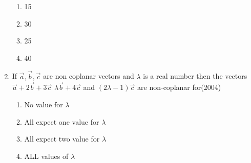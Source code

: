 \documentclass[12pt]{article}
\providecommand{\brak}[1]{\ensuremath{\left(#1\right)}}
\begin{document}
\begin{enumerate}
\begin{enumerate}
\item 15
\item 30
\item 25 
\item 40
\end{enumerate} 
\item If $\vec{a},\vec{b},\vec{c}$ are non coplanar vectors and $\lambda$ is a real number then the vectors $\vec{a}+2\vec{b}+3\vec{c}$ $\lambda\vec{b}+4\vec{c}$ and $\brak{2\lambda-1}\vec{c}$ are non-coplanar for(2004) 
\begin{enumerate}
\item  No value for $\lambda$
\item  All expect one value for $\lambda$
\item  All expect two value for $\lambda$
\item  ALL values of $\lambda$
\end{enumerate}


\end{enumerate}
\end{document}

